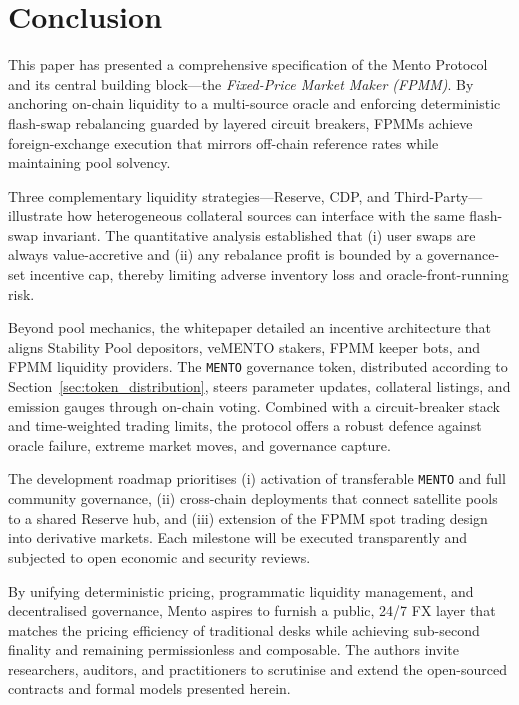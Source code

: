\documentclass[a4paper]{article}
\theoremstyle{definition}
\begin{document}
\section{Conclusion}
\label{sec:conclusion}
This paper has presented a comprehensive specification of the Mento Protocol and its central building block—the \emph{Fixed-Price Market Maker (FPMM)}. By anchoring on-chain liquidity to a multi-source oracle and enforcing deterministic flash-swap rebalancing guarded by layered circuit breakers, FPMMs achieve foreign-exchange execution that mirrors off-chain reference rates while maintaining pool solvency.

Three complementary liquidity strategies—Reserve, CDP, and Third-Party—illustrate how heterogeneous collateral sources can interface with the same flash-swap invariant. The quantitative analysis established that (i) user swaps are always value-accretive and (ii) any rebalance profit is bounded by a governance-set incentive cap, thereby limiting adverse inventory loss and oracle-front-running risk.

Beyond pool mechanics, the whitepaper detailed an incentive architecture that aligns Stability Pool depositors, veMENTO stakers, FPMM keeper bots, and FPMM liquidity providers. The \texttt{MENTO} governance token, distributed according to Section~\ref{sec:token_distribution}, steers parameter updates, collateral listings, and emission gauges through on-chain voting. Combined with a circuit-breaker stack and time-weighted trading limits, the protocol offers a robust defence against oracle failure, extreme market moves, and governance capture.

The development roadmap prioritises (i) activation of transferable \texttt{MENTO} and full community governance, (ii) cross-chain deployments that connect satellite pools to a shared Reserve hub, and (iii) extension of the FPMM spot trading design into derivative markets. Each milestone will be executed transparently and subjected to open economic and security reviews.

By unifying deterministic pricing, programmatic liquidity management, and decentralised governance, Mento aspires to furnish a public, 24/7 FX layer that matches the pricing efficiency of traditional desks while achieving sub-second finality and remaining permissionless and composable. The authors invite researchers, auditors, and practitioners to scrutinise and extend the open-sourced contracts and formal models presented herein.
\end{document}
